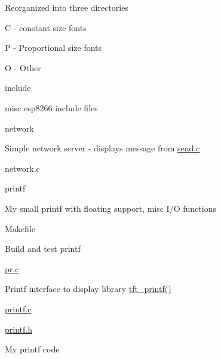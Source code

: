 \begin{DoxyItemize}
\begin{DoxyItemize}
\begin{DoxyItemize}
\begin{DoxyItemize}
\item Reorganized into three directories
\begin{DoxyItemize}
\item C -\/ constant size fonts
\item P -\/ Proportional size fonts
\item O -\/ Other
\end{DoxyItemize}
\end{DoxyItemize}
\end{DoxyItemize}
\end{DoxyItemize}
\item include
\begin{DoxyItemize}
\item misc esp8266 include files
\end{DoxyItemize}
\item network
\begin{DoxyItemize}
\item Simple network server -\/ displays message from \hyperlink{send_8c}{send.\-c}
\begin{DoxyItemize}
\item network.\-c
\end{DoxyItemize}
\end{DoxyItemize}
\item printf
\begin{DoxyItemize}
\item My small printf with floating support, misc I/\-O functions
\begin{DoxyItemize}
\item Makefile
\begin{DoxyItemize}
\item Build and test printf
\end{DoxyItemize}
\item \hyperlink{pr_8c}{pr.\-c}
\begin{DoxyItemize}
\item Printf interface to display library \hyperlink{pr_8c_ad6d6dda4facdc045d477c0cc9403e0c1}{tft\-\_\-printf()}
\end{DoxyItemize}
\item \hyperlink{printf_8c}{printf.\-c}
\item \hyperlink{printf_8h}{printf.\-h}
\begin{DoxyItemize}
\item My printf code
\end{DoxyItemize}
\end{DoxyItemize}
\end{DoxyItemize}

\end{DoxyItemize}
